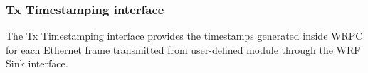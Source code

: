 \subsubsection{Tx Timestamping interface}
\label{sec:txts}

The Tx Timestamping interface provides the timestamps generated inside WRPC for each
Ethernet frame transmitted from user-defined module through the WRF Sink interface.\\

